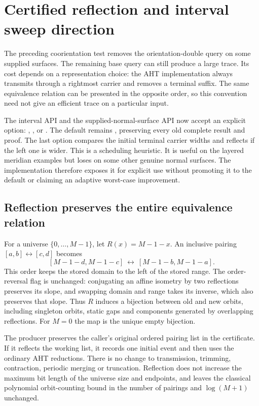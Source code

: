 \section{Certified reflection and interval sweep direction}
\label{sec:orbit-direction}

The preceding coorientation test removes the orientation-double query on
some supplied surfaces. The remaining base query can still produce a large
trace. Its cost depends on a representation choice: the AHT implementation
always transmits through a rightmost carrier and removes a terminal suffix.
The same equivalence relation can be presented in the opposite order, so
this convention need not give an efficient trace on a particular input.

The interval API and the supplied-normal-surface API now accept an explicit
 option: , , or
. The default remains , preserving every old
complete result and proof. The last option compares the initial terminal
carrier widths and reflects if the left one is wider. This is a scheduling
heuristic. It is useful on the layered meridian examples but loses on some
other genuine normal surfaces. The implementation therefore exposes it for
explicit use without promoting it to the default or claiming an adaptive
worst-case improvement.

\subsection{Reflection preserves the entire equivalence relation}

For a universe $\{0,\ldots,M-1\}$, let $R(x)=M-1-x$.
An inclusive pairing $[a,b]\leftrightarrow[c,d]$ becomes
\[
 [M-1-d,M-1-c]\ \leftrightarrow\ [M-1-b,M-1-a].
\]
This order keeps the stored domain to the left of the stored range. The
order-reversal flag is unchanged: conjugating an affine isometry by two
reflections preserves its slope, and swapping domain and range takes its
inverse, which also preserves that slope. Thus $R$ induces a bijection
between old and new orbits, including singleton orbits, static gaps and
components generated by overlapping reflections. For $M=0$ the map is
the unique empty bijection.

The producer preserves the caller's original ordered pairing list in the
certificate. If it reflects the working list, it records one initial
 event and then uses the ordinary AHT reductions. There is
no change to transmission, trimming, contraction, periodic merging or
truncation. Reflection does not increase the maximum bit length of the
universe size and endpoints, and leaves the classical polynomial orbit-counting bound
in the number of pairings and $\log(M+1)$ unchanged.

